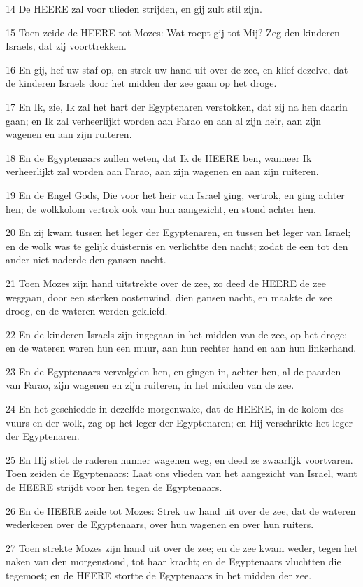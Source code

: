 \par 14 De HEERE zal voor ulieden strijden, en gij zult stil zijn.
\par 15 Toen zeide de HEERE tot Mozes: Wat roept gij tot Mij? Zeg den kinderen Israels, dat zij voorttrekken.
\par 16 En gij, hef uw staf op, en strek uw hand uit over de zee, en klief dezelve, dat de kinderen Israels door het midden der zee gaan op het droge.
\par 17 En Ik, zie, Ik zal het hart der Egyptenaren verstokken, dat zij na hen daarin gaan; en Ik zal verheerlijkt worden aan Farao en aan al zijn heir, aan zijn wagenen en aan zijn ruiteren.
\par 18 En de Egyptenaars zullen weten, dat Ik de HEERE ben, wanneer Ik verheerlijkt zal worden aan Farao, aan zijn wagenen en aan zijn ruiteren.
\par 19 En de Engel Gods, Die voor het heir van Israel ging, vertrok, en ging achter hen; de wolkkolom vertrok ook van hun aangezicht, en stond achter hen.
\par 20 En zij kwam tussen het leger der Egyptenaren, en tussen het leger van Israel; en de wolk was te gelijk duisternis en verlichtte den nacht; zodat de een tot den ander niet naderde den gansen nacht.
\par 21 Toen Mozes zijn hand uitstrekte over de zee, zo deed de HEERE de zee weggaan, door een sterken oostenwind, dien gansen nacht, en maakte de zee droog, en de wateren werden gekliefd.
\par 22 En de kinderen Israels zijn ingegaan in het midden van de zee, op het droge; en de wateren waren hun een muur, aan hun rechter hand en aan hun linkerhand.
\par 23 En de Egyptenaars vervolgden hen, en gingen in, achter hen, al de paarden van Farao, zijn wagenen en zijn ruiteren, in het midden van de zee.
\par 24 En het geschiedde in dezelfde morgenwake, dat de HEERE, in de kolom des vuurs en der wolk, zag op het leger der Egyptenaren; en Hij verschrikte het leger der Egyptenaren.
\par 25 En Hij stiet de raderen hunner wagenen weg, en deed ze zwaarlijk voortvaren. Toen zeiden de Egyptenaars: Laat ons vlieden van het aangezicht van Israel, want de HEERE strijdt voor hen tegen de Egyptenaars.
\par 26 En de HEERE zeide tot Mozes: Strek uw hand uit over de zee, dat de wateren wederkeren over de Egyptenaars, over hun wagenen en over hun ruiters.
\par 27 Toen strekte Mozes zijn hand uit over de zee; en de zee kwam weder, tegen het naken van den morgenstond, tot haar kracht; en de Egyptenaars vluchtten die tegemoet; en de HEERE stortte de Egyptenaars in het midden der zee.
